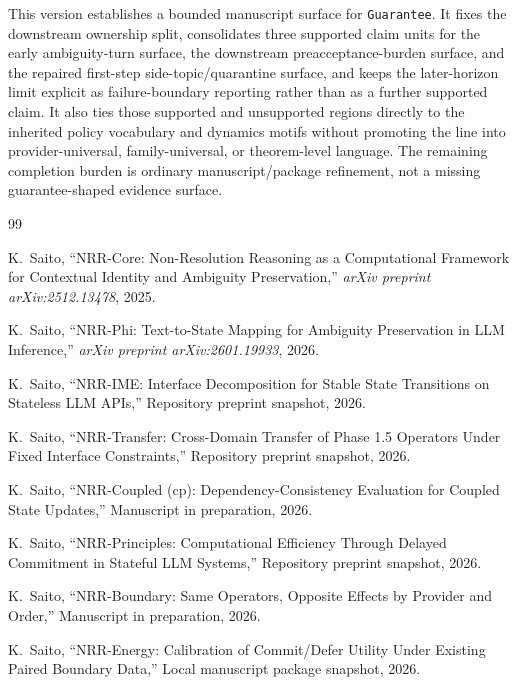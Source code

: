 \documentclass[11pt]{article}
\begin{document}
This version establishes a bounded manuscript surface for \texttt{Guarantee}.
It fixes the downstream ownership split, consolidates three
supported claim units for the early ambiguity-turn surface, the downstream
preacceptance-burden surface, and the repaired first-step side-topic/quarantine
surface, and keeps the later-horizon limit explicit as failure-boundary
reporting rather than as a further supported claim. It also ties those
supported and unsupported regions directly to the inherited policy vocabulary
and dynamics motifs without promoting the line into provider-universal,
family-universal, or theorem-level language. The remaining completion burden is
ordinary manuscript/package refinement, not a missing guarantee-shaped evidence
surface.

\begin{thebibliography}{99}
\raggedright

K.~Saito,
\newblock ``NRR-Core: Non-Resolution Reasoning as a Computational Framework for Contextual Identity and Ambiguity Preservation,''
\newblock \emph{arXiv preprint arXiv:2512.13478}, 2025.

K.~Saito,
\newblock ``NRR-Phi: Text-to-State Mapping for Ambiguity Preservation in LLM Inference,''
\newblock \emph{arXiv preprint arXiv:2601.19933}, 2026.

K.~Saito,
\newblock ``NRR-IME: Interface Decomposition for Stable State Transitions on Stateless LLM APIs,''
\newblock Repository preprint snapshot, 2026.

K.~Saito,
\newblock ``NRR-Transfer: Cross-Domain Transfer of Phase 1.5 Operators Under Fixed Interface Constraints,''
\newblock Repository preprint snapshot, 2026.

K.~Saito,
\newblock ``NRR-Coupled (cp): Dependency-Consistency Evaluation for Coupled State Updates,''
\newblock Manuscript in preparation, 2026.

K.~Saito,
\newblock ``NRR-Principles: Computational Efficiency Through Delayed Commitment in Stateful LLM Systems,''
\newblock Repository preprint snapshot, 2026.

K.~Saito,
\newblock ``NRR-Boundary: Same Operators, Opposite Effects by Provider and Order,''
\newblock Manuscript in preparation, 2026.

K.~Saito,
\newblock ``NRR-Energy: Calibration of Commit/Defer Utility Under Existing Paired Boundary Data,''
\newblock Local manuscript package snapshot, 2026.

\end{thebibliography}
\end{document}
